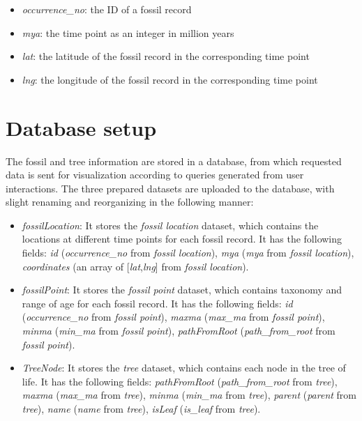 \documentclass[11pt, a4paper,oneside,chapterprefix=false]{scrbook}
\begin{document}
\begin{itemize}
	\item \textit{occurrence\_no}: the ID of a fossil record
	\item \textit{mya}: the time point as an integer in million years
	\item \textit{lat}: the latitude of the fossil record in the corresponding time point
	\item \textit{lng}: the longitude of the fossil record in the corresponding time point
\end{itemize}

\section{Database setup} \label{sec:tec_database_setup}
The fossil and tree information are stored in a database, from which requested data is sent for visualization according to queries generated from user interactions. The three prepared datasets are uploaded to the database, with slight renaming and reorganizing in the following manner:

\begin{itemize}
	\item \textit{fossilLocation}: It stores the \textit{fossil location} dataset, which contains the locations at different time points for each fossil record. It has the following fields: \textit{id} (\textit{occurrence\_no} from \textit{fossil location}), \textit{mya} (\textit{mya} from \textit{fossil location}), \textit{coordinates} (an array of [\textit{lat},\textit{lng}] from \textit{fossil location}).
	\item \textit{fossilPoint}: It stores the \textit{fossil point} dataset, which contains taxonomy and range of age for each fossil record. It has the following fields: \textit{id} (\textit{occurrence\_no} from \textit{fossil point}), \textit{maxma} (\textit{max\_ma} from \textit{fossil point}), \textit{minma} (\textit{min\_ma} from \textit{fossil point}), \textit{pathFromRoot} (\textit{path\_from\_root} from \textit{fossil point}).
	\item \textit{TreeNode}: It stores the \textit{tree} dataset, which contains each node in the tree of life. It has the following fields: \textit{pathFromRoot} (\textit{path\_from\_root} from \textit{tree}), \textit{maxma} (\textit{max\_ma} from \textit{tree}), \textit{minma} (\textit{min\_ma} from \textit{tree}), \textit{parent} (\textit{parent} from \textit{tree}), \textit{name} (\textit{name} from \textit{tree}), \textit{isLeaf} (\textit{is\_leaf} from \textit{tree}).
\end{itemize}
\end{document}
